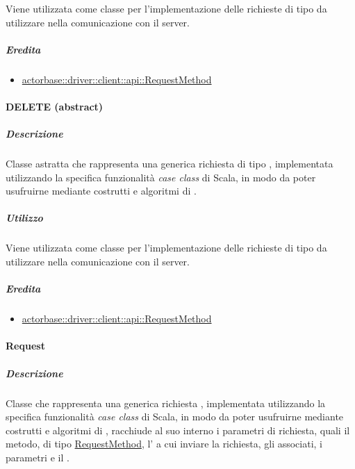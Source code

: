 \documentclass{scalatekids-article}
\begin{document}
Viene utilizzata come classe per l'implementazione delle richieste 
di tipo  da utilizzare nella comunicazione con il server.

\subparagraph{Eredita}

\begin{itemize}
\item \hyperref[sec:actorbase::driver::client::api::RequestMethod]{actorbase::driver::client::api::RequestMethod}
\end{itemize}


\paragraph{DELETE (abstract)}
\label{sec:actorbase::driver::client::api::DELETE}

\subparagraph{Descrizione}

Classe astratta che rappresenta una generica richiesta  di tipo
, implementata utilizzando la specifica funzionalità \textit{case
  class} di Scala, in modo da poter usufruirne mediante costrutti e algoritmi di
.

\subparagraph{Utilizzo}

Viene utilizzata come classe per l'implementazione delle richieste 
di tipo  da utilizzare nella comunicazione con il server.

\subparagraph{Eredita}

\begin{itemize}
\item \hyperref[sec:actorbase::driver::client::api::RequestMethod]{actorbase::driver::client::api::RequestMethod}
\end{itemize}


\paragraph{Request}
\label{sec:actorbase::driver::client::api::Request}

\subparagraph{Descrizione}

Classe che rappresenta una generica richiesta , implementata
utilizzando la specifica funzionalità \textit{case class} di Scala, in modo da
poter usufruirne mediante costrutti e algoritmi di ,
racchiude al suo interno i parametri di richiesta, quali il metodo, di tipo
\hyperref[sec:actorbase::driver::client::api::RequestMethod]{RequestMethod},
l' a cui inviare la richiesta, gli  
associati, i parametri e il .
\end{document}
